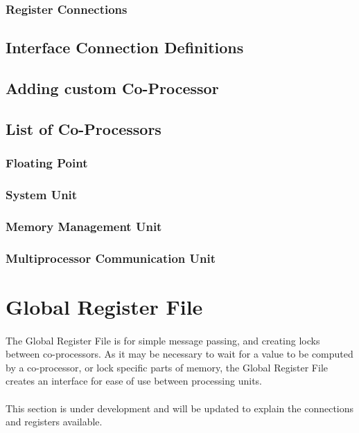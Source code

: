 \documentclass[letterpaper, 11pt]{article}
\begin{document}
\subsubsection{Register Connections}
\subsection{Interface Connection Definitions}
\subsection{Adding custom Co-Processor}
\subsection{List of Co-Processors}
\subsubsection{Floating Point}
\subsubsection{System Unit}
\subsubsection{Memory Management Unit}
\subsubsection{Multiprocessor Communication Unit}

\section{Global Register File}
\paragraph{}The Global Register File is for simple message passing, and creating locks between co-processors.
As it may be necessary to wait for a value to be computed by a co-processor, or lock specific parts of memory,
the Global Register File creates an interface for ease of use between processing units.
\paragraph{}This section is under development and will be updated to explain the connections and registers available.
\end{document}
